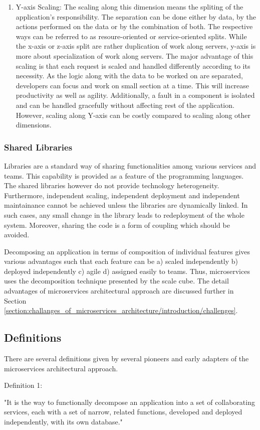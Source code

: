 \begin{enumerate}
\begin{enumerate}
\\
\item Y-axis Scaling: The scaling along this dimension means the spliting of the application's responsibility. The separation can be done either by data, by the actions performed on the data or by the combination of both. The respective ways can be referred to as resoure-oriented or service-oriented splits. While the x-axis or z-axis split are rather duplication of work along servers, y-axis is more about specialization of work along servers. The major advantage of this scaling is that each request is scaled and handled differently according to its necessity. As the logic along with the data to be worked on are separated, developers can focus and work on small section at a time. This will increase productivity as well as agility. Additionally, a fault in a component is isolated and can be handled gracefully without affecting rest of the application. However, scaling along Y-axis can be costly compared to scaling along other dimensions.
\end{enumerate}
\subsubsection{Shared Libraries}\label{section:context/microservices_architecture_style/decompostion_of_an_application/shared_libraries}
Libraries are a standard way of sharing functionalities among various services and teams. This capability is provided as a feature of the programming languages. The shared libraries however do not provide technology heterogeneity. Furthermore,  independent scaling, independent deployment and independent maintainance cannot be achieved unless the libraries are dynamically linked. In such cases, any small change in the library leads to redeployment of the whole system. Moreover, sharing the code is a form of coupling which should be avoided.

Decomposing an application in terms of composition of individual features gives various advantages such that each feature can be a) scaled independently b) deployed independently c) agile d) assigned easily to teams. Thus, microservices uses the decomposition technique presented by the scale cube. The detail advantages of microservices architectural approach are discussed further in Section \ref{section:challanges_of_microservices_architecture/introduction/challenges}.
\subsection{Definitions}\label{section:context/microservices_architecture_style/definitions}
There are several definitions given by several pioneers and early adapters of the microservices architectural approach.
\\
\begin{shaded}Definition 1: \cite{Richardson:2014ac} \end{shaded}
"It is the way to functionally decompose an application into a set of collaborating services, each with a set of narrow, related functions, developed and deployed independently, with its own database."


\end{enumerate}
